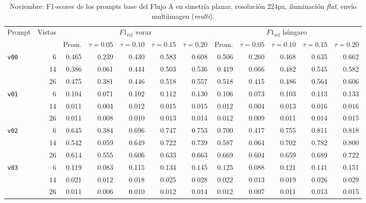 \begin{table}[htbp]
\centering
\caption{Noviembre: F1-scores de los prompts base del Flujo A en simetría planar, resolución 224px, iluminación \textit{flat}, envío multiimagen (\textit{multi}).}
\label{tab:nov_plane_base_f1}
\begin{lrbox}{\tablebox}
\begin{adjustbox}{max width=\textwidth}
\begin{tabular}{lrrrrrrrrrrr}
\toprule
\multirow{2}{*}{Prompt} & \multirow{2}{*}{Vistas} & \multicolumn{5}{c}{$F1_{\mathrm{ref}}$ voraz} & \multicolumn{5}{c}{$F1_{\mathrm{ref}}$ húngaro} \\
\cmidrule(lr){3-7} \cmidrule(lr){8-12}
 &  & Prom. & $\tau{=}0.05$ & $\tau{=}0.10$ & $\tau{=}0.15$ & $\tau{=}0.20$ & Prom. & $\tau{=}0.05$ & $\tau{=}0.10$ & $\tau{=}0.15$ & $\tau{=}0.20$ \\
\midrule
\multirow{3}{*}{\texttt{v00}} & 6 & 0.465 & 0.239 & 0.430 & 0.583 & 0.608 & 0.506 & 0.260 & 0.468 & 0.635 & 0.662 \\
 & 14 & 0.386 & 0.061 & 0.444 & 0.503 & 0.536 & 0.419 & 0.066 & 0.482 & 0.545 & 0.582 \\
 & 26 & 0.475 & 0.381 & 0.446 & 0.518 & 0.557 & 0.518 & 0.415 & 0.486 & 0.564 & 0.606 \\
\midrule
\multirow{3}{*}{\texttt{v01}} & 6 & 0.104 & 0.071 & 0.102 & 0.112 & 0.130 & 0.106 & 0.073 & 0.103 & 0.113 & 0.133 \\
 & 14 & 0.011 & 0.004 & 0.012 & 0.015 & 0.015 & 0.012 & 0.004 & 0.013 & 0.016 & 0.016 \\
 & 26 & 0.011 & 0.008 & 0.010 & 0.013 & 0.014 & 0.012 & 0.009 & 0.011 & 0.014 & 0.015 \\
\midrule
\multirow{3}{*}{\texttt{v02}} & 6 & 0.645 & 0.384 & 0.696 & 0.747 & 0.753 & 0.700 & 0.417 & 0.755 & 0.811 & 0.818 \\
 & 14 & 0.542 & 0.059 & 0.649 & 0.722 & 0.739 & 0.587 & 0.064 & 0.702 & 0.782 & 0.800 \\
 & 26 & 0.614 & 0.555 & 0.606 & 0.633 & 0.663 & 0.669 & 0.604 & 0.659 & 0.689 & 0.722 \\
\midrule
\multirow{3}{*}{\texttt{v03}} & 6 & 0.119 & 0.083 & 0.115 & 0.134 & 0.145 & 0.125 & 0.088 & 0.121 & 0.141 & 0.151 \\
 & 14 & 0.021 & 0.012 & 0.018 & 0.025 & 0.028 & 0.022 & 0.013 & 0.019 & 0.026 & 0.029 \\
 & 26 & 0.011 & 0.006 & 0.010 & 0.012 & 0.014 & 0.012 & 0.007 & 0.011 & 0.013 & 0.015 \\

\end{tabular}
\end{adjustbox}
\end{lrbox}
\end{table}
